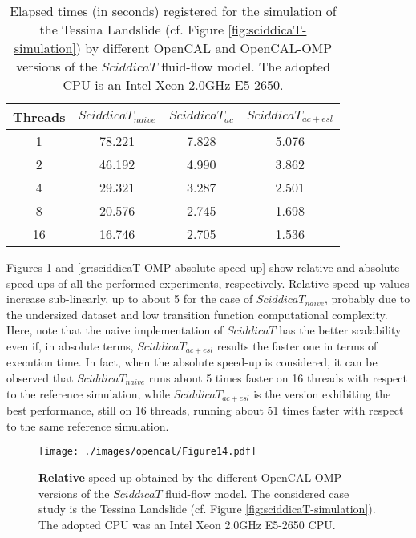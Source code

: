 \begin{table}
	\centering
	\begin{tabular}{cccc}
		\hline Threads & $SciddicaT_{naive}$ & $SciddicaT_{ac}$ &
		$SciddicaT_{ac+esl}$ \\ \hline 1 & 78.221 & 7.828 & 5.076\\ 2 &
		46.192 & 4.990 & 3.862\\ 4 & 29.321 & 3.287 & 2.501\\ 8 & 20.576
		& 2.745 & 1.698\\ 16 & 16.746 & 2.705 & 1.536\\ \hline
	\end{tabular}
	\caption{Elapsed times (in seconds) registered for the simulation of the
		Tessina Landslide (cf. Figure \ref{fig:sciddicaT-simulation}) by
		different OpenCAL and OpenCAL-OMP versions of the $SciddicaT$
		fluid-flow model. The adopted CPU is an Intel Xeon 2.0GHz E5-2650.}
	\label{tab:sciddicaT-OMP-execution-times}
\end{table}

Figures \ref{gr:sciddicaT-OMP-relative-speed-up} and
\ref{gr:sciddicaT-OMP-absolute-speed-up} show relative and
absolute speed-ups of all the performed experiments,
respectively. Relative speed-up values increase sub-linearly, up
to about 5 for the case of $SciddicaT_{naive}$, probably due to
the undersized dataset and low transition function computational
complexity. Here, note that the naive implementation of
$SciddicaT$ has the better scalability even if, in absolute terms,
$SciddicaT_{ac+esl}$ results the faster one in terms of execution
time. In fact, when the absolute speed-up is considered, it can be
observed that $SciddicaT_{naive}$ runs about 5 times faster on 16
threads with respect to the reference simulation, while
$SciddicaT_{ac+esl}$ is the version exhibiting the best
performance, still on 16 threads, running about 51 times faster
with respect to the same reference simulation.

\begin{figure}
	\begin{center}
		\texttt{[image: ./images/opencal/Figure14.pdf]}
		\caption[\textbf{Relative} speed-up obtained by the different OpenCAL-OMP versions of
		the $SciddicaT$ fluid-flow model.]{\textbf{Relative} speed-up obtained by the different OpenCAL-OMP versions of
			the $SciddicaT$ fluid-flow model. The considered case study is the
			Tessina Landslide (cf. Figure \ref{fig:sciddicaT-simulation}). The
			adopted CPU was an Intel Xeon 2.0GHz E5-2650 CPU.}
		\label{gr:sciddicaT-OMP-relative-speed-up}
	\end{center}
\end{figure}

